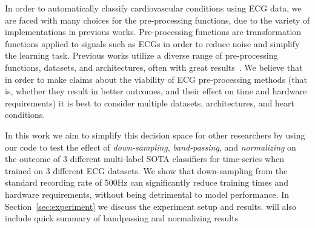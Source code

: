 \documentclass[pmlr,twocolumn]{jmlr}%
\begin{document}
In order to automatically classify cardiovascular conditions using ECG data, we are faced with many choices for the pre-processing functions, due to the variety of implementations in previous works. Pre-processing functions are transformation functions applied to signals such as ECGs in order to reduce noise and simplify the learning task. Previous works utilize a diverse range of pre-processing functions, datasets, and architectures, often with great results~\cite{hong2022practical}. We believe that in order to make claims about the viability of ECG pre-processing methods (that is, whether they result in better outcomes, and their effect on time and hardware requirements) it is best to consider multiple datasets, architectures, and heart conditions.  


In this work we aim to simplify this decision space for other researchers by using our code to test the effect of \textit{down-sampling}, \textit{band-passing}, and \textit{normalizing} on the outcome of 3 different multi-label SOTA classifiers for time-series when trained on 3 different ECG datasets. We show that down-sampling from the standard recording rate of 500Hz can significantly reduce training times and hardware requirements, without being detrimental to model performance. In Section~\ref{sec:experiment} we discuss the experiment setup and results.  {\color{red} will also include quick summary of bandpassing and normalizing results}\\



\begin{table}[tbp]
\label{tab:top5}
{\caption{Top 5 teams in Physionet2020 and pre-processing functions used.}}%
    
    { 
}

\end{table}
\end{document}
